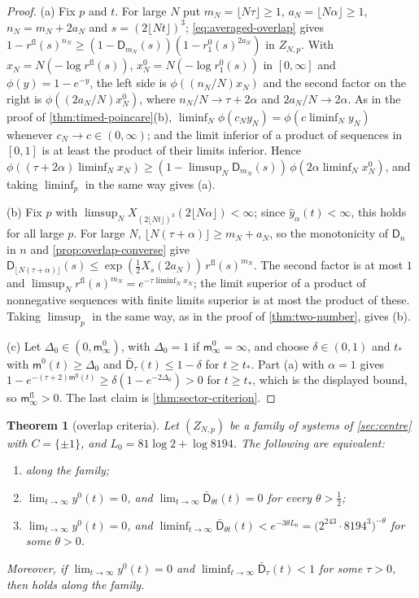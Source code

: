 \documentclass[11pt,a4paper]{amsart}
\newtheorem{theorem}{Theorem}[section]
\theoremstyle{definition}
\theoremstyle{remark}
\numberwithin{equation}{section}
\newcommand{\TT}{\mathbb{T}}               %
\newcommand{\Zc}{\mathcal{Z}}              %
\newcommand{\XT}[2]{X_{#1}(#2)}            %
\newcommand{\cube}[1]{(2#1)^3}             %
\newcommand{\Mcirc}{\text{\upshape(M$^{\circ}$)}}   %
\begin{document}
\begin{proof}
(a) Fix $p$ and $t$. For large $N$ put $m_N=\lfloor N\tau\rfloor\ge1$, $a_N=\lfloor N\alpha\rfloor\ge1$, $n_N=m_N+2a_N$ and $s=\cube{\lfloor Nt\rfloor}$; \eqref{eq:averaged-overlap} gives $1-r^{\mathrm{fl}}(s)^{n_N}\ge(1-\mathsf D_{m_N}(s))(1-r_1^0(s)^{2a_N})$ in $Z_{N,p}$. With $x_N=N(-\log r^{\mathrm{fl}}(s))$, $x^0_N=N(-\log r_1^0(s))$ in $[0,\infty]$ and $\phi(y)=1-e^{-y}$, the left side is $\phi((n_N/N)x_N)$ and the second factor on the right is $\phi((2a_N/N)x^0_N)$, where $n_N/N\to\tau+2\alpha$ and $2a_N/N\to2\alpha$. As in the proof of \cref{thm:timed-poincare}(b), $\liminf_N\phi(c_Ny_N)=\phi(c\liminf_Ny_N)$ whenever $c_N\to c\in(0,\infty)$; and the limit inferior of a product of sequences in $[0,1]$ is at least the product of their limits inferior. Hence $\phi((\tau+2\alpha)\liminf_Nx_N)\ge(1-\limsup_N\mathsf D_{m_N}(s))\,\phi(2\alpha\liminf_Nx^0_N)$, and taking $\liminf_p$ in the same way gives (a).

(b) Fix $p$ with $\limsup_N\XT{\cube{\lfloor Nt\rfloor}}{2\lfloor N\alpha\rfloor}<\infty$; since $\hat y_\alpha(t)<\infty$, this holds for all large $p$. For large $N$, $\lfloor N(\tau+\alpha)\rfloor\ge m_N+a_N$, so the monotonicity of $\mathsf D_n$ in $n$ and \cref{prop:overlap-converse} give $\mathsf D_{\lfloor N(\tau+\alpha)\rfloor}(s)\le\exp(\frac12\XT{s}{2a_N})\,r^{\mathrm{fl}}(s)^{m_N}$. The second factor is at most $1$ and $\limsup_Nr^{\mathrm{fl}}(s)^{m_N}=e^{-\tau\liminf_Nx_N}$; the limit superior of a product of nonnegative sequences with finite limits superior is at most the product of these. Taking $\limsup_p$ in the same way, as in the proof of \cref{thm:two-number}, gives (b).

(c) Let $\Delta_0\in(0,\mathsf m^0_\infty)$, with $\Delta_0=1$ if $\mathsf m^0_\infty=\infty$, and choose $\delta\in(0,1)$ and $t_*$ with $\mathsf m^0(t)\ge\Delta_0$ and $\bar{\mathsf D}_\tau(t)\le1-\delta$ for $t\ge t_*$. Part (a) with $\alpha=1$ gives $1-e^{-(\tau+2)\mathsf m^{\mathrm{fl}}(t)}\ge\delta(1-e^{-2\Delta_0})>0$ for $t\ge t_*$, which is the displayed bound, so $\mathsf m^{\mathrm{fl}}_\infty>0$. The last claim is \cref{thm:sector-criterion}.
\end{proof}

\begin{theorem}[overlap criteria]\label{thm:overlap-criteria}
Let $(Z_{N,p})$ be a family of systems of \cref{sec:centre} with $C=\{\pm1\}$, and $L_0=81\log2+\log8194$. The following are equivalent:
\begin{enumerate}[label=\textup{(\alph*)},leftmargin=*]
\item \Mcirc{} along the family;
\item $\lim_{t\to\infty}y^0(t)=0$, and $\lim_{t\to\infty}\bar{\mathsf D}_{\theta t}(t)=0$ for every $\theta>\frac12$;
\item $\lim_{t\to\infty}y^0(t)=0$, and $\liminf_{t\to\infty}\bar{\mathsf D}_{\theta t}(t)<e^{-3\theta L_0}=\bigl(2^{243}\cdot8194^3\bigr)^{-\theta}$ for some $\theta>0$.
\end{enumerate}
Moreover, if $\lim_{t\to\infty}y^0(t)=0$ and $\liminf_{t\to\infty}\bar{\mathsf D}_\tau(t)<1$ for some $\tau>0$, then \Mcirc{} holds along the family.
\end{theorem}
\end{document}
